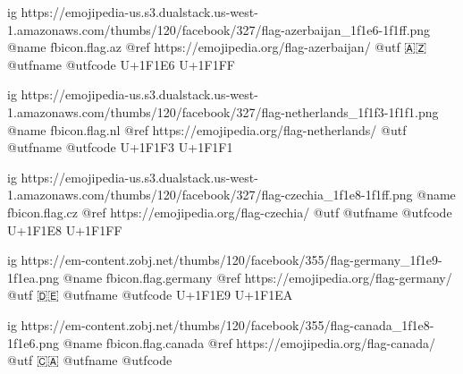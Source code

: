 	ig https://emojipedia-us.s3.dualstack.us-west-1.amazonaws.com/thumbs/120/facebook/327/flag-azerbaijan_1f1e6-1f1ff.png
	@name fbicon.flag.az
	@ref https://emojipedia.org/flag-azerbaijan/
	@utf 🇦🇿
	@utfname
	@utfcode U+1F1E6 U+1F1FF

	ig https://emojipedia-us.s3.dualstack.us-west-1.amazonaws.com/thumbs/120/facebook/327/flag-netherlands_1f1f3-1f1f1.png
	@name fbicon.flag.nl
	@ref https://emojipedia.org/flag-netherlands/
	@utf
	@utfname
	@utfcode  U+1F1F3 U+1F1F1

	ig https://emojipedia-us.s3.dualstack.us-west-1.amazonaws.com/thumbs/120/facebook/327/flag-czechia_1f1e8-1f1ff.png
	@name fbicon.flag.cz
	@ref https://emojipedia.org/flag-czechia/
	@utf
	@utfname
	@utfcode U+1F1E8 U+1F1FF

	ig https://em-content.zobj.net/thumbs/120/facebook/355/flag-germany_1f1e9-1f1ea.png
	@name fbicon.flag.germany
	@ref https://emojipedia.org/flag-germany/
	@utf 🇩🇪
	@utfname
	@utfcode U+1F1E9 U+1F1EA

	ig https://em-content.zobj.net/thumbs/120/facebook/355/flag-canada_1f1e8-1f1e6.png
	@name fbicon.flag.canada
	@ref https://emojipedia.org/flag-canada/
	@utf 🇨🇦
	@utfname
	@utfcode
	
\fi
